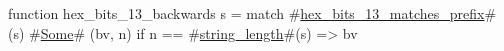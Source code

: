 function hex_bits_13_backwards s =
  match #\hyperref[sailRISCVzhexzybitszy13zymatcheszyprefix]{hex\_bits\_13\_matches\_prefix}#(s) {
      #\hyperref[sailRISCVzSome]{Some}# (bv, n) if n == #\hyperref[sailRISCVzstringzylength]{string\_length}#(s) => bv
  }
